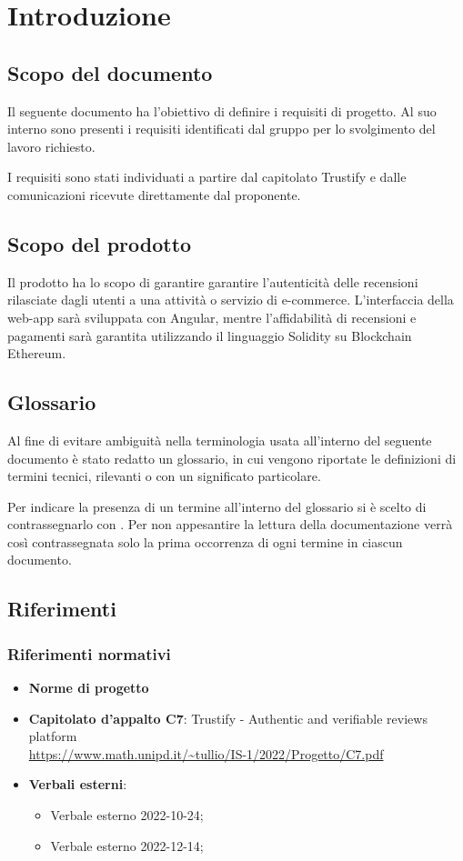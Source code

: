 \section{Introduzione}


\subsection{Scopo del documento}
Il seguente documento ha l'obiettivo di definire i requisiti di progetto. Al suo interno sono presenti i requisiti
identificati dal gruppo \groupName\: per lo svolgimento del lavoro richiesto.

I requisiti sono stati individuati a partire dal capitolato Trustify
e dalle comunicazioni ricevute direttamente dal proponente.

\subsection{Scopo del prodotto}
Il prodotto ha lo scopo di garantire garantire l'autenticità
delle recensioni rilasciate dagli utenti a una attività o servizio di e-commerce. L'interfaccia della web-app sarà
sviluppata con Angular, mentre l'affidabilità di recensioni e pagamenti sarà garantita utilizzando il linguaggio Solidity su Blockchain Ethereum.


\subsection{Glossario}
Al fine di evitare ambiguità nella terminologia usata all'interno del seguente
documento è stato redatto un glossario, in cui vengono riportate le definizioni
di termini tecnici, rilevanti o con un significato particolare.

Per indicare
la presenza di un termine all'interno del glossario si è scelto di
contrassegnarlo con \glo. Per non appesantire la lettura della documentazione
verrà così contrassegnata solo la prima occorrenza di ogni termine in ciascun
documento.

\subsection{Riferimenti}
    \subsubsection{Riferimenti normativi}
        \begin{itemize}
            \item \textbf{Norme di progetto}
            \item \textbf{Capitolato d'appalto C7}: Trustify - Authentic and verifiable reviews platform \\
            \url{https://www.math.unipd.it/~tullio/IS-1/2022/Progetto/C7.pdf}
            \item \textbf{Verbali esterni}:
            \begin{itemize}
                \item Verbale esterno 2022-10-24;
                \item Verbale esterno 2022-12-14;
            \end{itemize}
        \end{itemize}
